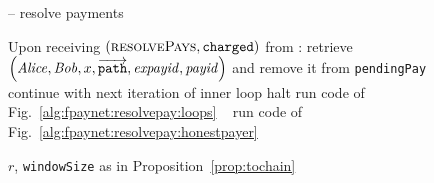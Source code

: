   \begin{figure}[H]
    \begin{systembox}{\fpaynet{} -- resolve payments}
      \begin{algorithmic}[1]
        \State Upon receiving $\left(\textsc{resolvePays},
        \mathtt{charged}\right)$ from \simulator:
        \Indent
              \label{alg:fpaynet:resolvepay:innerloop}
              \State retrieve $\left(\alice, \bob, x,
              \overrightarrow{\mathtt{path}}, \redden{\mathit{expayid}},
              \mathit{payid}\right)$ and remove it from \texttt{pendingPay}
              \If{$\dave{} = \bot$} 
              \label{alg:fpaynet:resolvepay:failed:if}
                \State continue with next iteration of inner loop
                \label{alg:fpaynet:resolvepay:continue}
                \State halt 
                \label{alg:fpaynet:resolvepay:halt:path}
                \State run code of Fig.~\ref{alg:fpaynet:resolvepay:loops}
                \label{alg:fpaynet:resolvepay:corrupted:gotoloops}
                \State {}
                \label{alg:fpaynet:resolvepay:corr:credit}
              \Else \ 
                \State run code of Fig.~\ref{alg:fpaynet:resolvepay:honestpayer}
              \EndIf
            \EndFor
          \EndFor
        \EndIndent
      \end{algorithmic}
    \end{systembox}
    \caption{$r$, \texttt{windowSize} as in Proposition~\ref{prop:tochain}}
    \label{alg:fpaynet:resolvepay}
  \end{figure}

